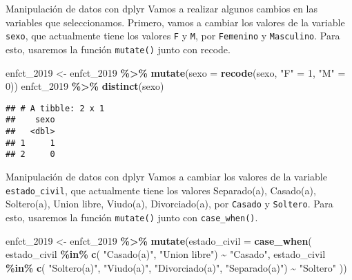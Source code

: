\documentclass[
  ignorenonframetext,
]{beamer}
\newenvironment{Shaded}{\begin{snugshade}}{\end{snugshade}}
\newcommand{\AttributeTok}[1]{\textcolor[rgb]{0.13,0.29,0.53}{#1}}
\newcommand{\DecValTok}[1]{\textcolor[rgb]{0.00,0.00,0.81}{#1}}
\newcommand{\FunctionTok}[1]{\textcolor[rgb]{0.13,0.29,0.53}{\textbf{#1}}}
\newcommand{\NormalTok}[1]{#1}
\newcommand{\OtherTok}[1]{\textcolor[rgb]{0.56,0.35,0.01}{#1}}
\newcommand{\SpecialCharTok}[1]{\textcolor[rgb]{0.81,0.36,0.00}{\textbf{#1}}}
\newcommand{\StringTok}[1]{\textcolor[rgb]{0.31,0.60,0.02}{#1}}
\begin{document}
\begin{frame}[fragile]{Manipulación de datos con dplyr}
\label{manipulaciuxf3n-de-datos-con-dplyr-7}
Vamos a realizar algunos cambios en las variables que seleccionamos.
Primero, vamos a cambiar los valores de la variable \texttt{sexo}, que
actualmente tiene los valores \texttt{F} y \texttt{M}, por
\texttt{Femenino} y \texttt{Masculino}. Para esto, usaremos la función
\texttt{mutate()} junto con recode.

\begin{Shaded}
\begin{Highlighting}[]
\NormalTok{enfct\_2019 }\OtherTok{\textless{}{-}}\NormalTok{ enfct\_2019 }\SpecialCharTok{\%\textgreater{}\%}
  \FunctionTok{mutate}\NormalTok{(}\AttributeTok{sexo =} \FunctionTok{recode}\NormalTok{(sexo, }
                       \StringTok{"F"} \OtherTok{=} \DecValTok{1}\NormalTok{, }
                       \StringTok{"M"} \OtherTok{=} \DecValTok{0}\NormalTok{))}
\NormalTok{enfct\_2019 }\SpecialCharTok{\%\textgreater{}\%} \FunctionTok{distinct}\NormalTok{(sexo)}
\end{Highlighting}
\end{Shaded}

\begin{verbatim}
## # A tibble: 2 x 1
##    sexo
##   <dbl>
## 1     1
## 2     0
\end{verbatim}
\end{frame}

\begin{frame}[fragile]{Manipulación de datos con dplyr}
\label{manipulaciuxf3n-de-datos-con-dplyr-8}
Vamos a cambiar los valores de la variable \texttt{estado\_civil}, que
actualmente tiene los valores Separado(a), Casado(a), Soltero(a), Union
libre, Viudo(a), Divorciado(a), por \texttt{Casado} y \texttt{Soltero}.
Para esto, usaremos la función \texttt{mutate()} junto con
\texttt{case\_when()}.

\begin{Shaded}
\begin{Highlighting}[]
\NormalTok{enfct\_2019 }\OtherTok{\textless{}{-}}\NormalTok{ enfct\_2019 }\SpecialCharTok{\%\textgreater{}\%} 
  \FunctionTok{mutate}\NormalTok{(}\AttributeTok{estado\_civil =} \FunctionTok{case\_when}\NormalTok{(}
\NormalTok{    estado\_civil }\SpecialCharTok{\%in\%} \FunctionTok{c}\NormalTok{(}
      \StringTok{"Casado(a)"}\NormalTok{, }\StringTok{"Union libre"}\NormalTok{) }\SpecialCharTok{\textasciitilde{}} \StringTok{"Casado"}\NormalTok{,}
\NormalTok{    estado\_civil }\SpecialCharTok{\%in\%} \FunctionTok{c}\NormalTok{(}
      \StringTok{"Soltero(a)"}\NormalTok{, }\StringTok{"Viudo(a)"}\NormalTok{, }\StringTok{"Divorciado(a)"}\NormalTok{, }
      \StringTok{"Separado(a)"}\NormalTok{) }\SpecialCharTok{\textasciitilde{}} \StringTok{"Soltero"}
\NormalTok{  ))}
\end{Highlighting}
\end{Shaded}
\end{frame}
\end{document}
